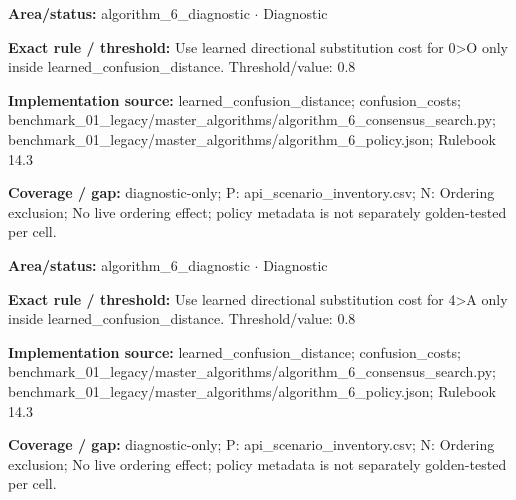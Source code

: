 \begin{tcolorbox}[enhanced,breakable,colback=white,colframe=Muted!45,boxrule=0.45pt,arc=1.5pt,left=6pt,right=6pt,top=5pt,bottom=5pt,title={\texttt{A6-LEARNED-SUBSTITUTION-0-O}},title after break={\texttt{A6-LEARNED-SUBSTITUTION-0-O}\ (continued)},fonttitle=\headingfont\bfseries\color{Navy},coltitle=Navy]
\textbf{Area/status:} algorithm\_\allowbreak{}6\_\allowbreak{}diagnostic $\boldsymbol{\cdot}$ Diagnostic\par
\smallskip
\textbf{Exact rule / threshold:} Use learned directional substitution cost for 0>O only inside learned\_\allowbreak{}confusion\_\allowbreak{}distance. Threshold/\allowbreak{}value: 0.8\par
\smallskip
\textbf{Implementation source:} learned\_\allowbreak{}confusion\_\allowbreak{}distance; confusion\_\allowbreak{}costs; benchmark\_\allowbreak{}01\_\allowbreak{}legacy/\allowbreak{}master\_\allowbreak{}algorithms/\allowbreak{}algorithm\_\allowbreak{}6\_\allowbreak{}consensus\_\allowbreak{}search.py; benchmark\_\allowbreak{}01\_\allowbreak{}legacy/\allowbreak{}master\_\allowbreak{}algorithms/\allowbreak{}algorithm\_\allowbreak{}6\_\allowbreak{}policy.json; Rulebook 14.3\par
\smallskip
\textbf{Coverage / gap:} diagnostic-only; P: api\_\allowbreak{}scenario\_\allowbreak{}inventory.csv; N: Ordering exclusion; No live ordering effect; policy metadata is not separately golden-tested per cell.
\end{tcolorbox}
\begin{tcolorbox}[enhanced,breakable,colback=white,colframe=Muted!45,boxrule=0.45pt,arc=1.5pt,left=6pt,right=6pt,top=5pt,bottom=5pt,title={\texttt{A6-LEARNED-SUBSTITUTION-4-A}},title after break={\texttt{A6-LEARNED-SUBSTITUTION-4-A}\ (continued)},fonttitle=\headingfont\bfseries\color{Navy},coltitle=Navy]
\textbf{Area/status:} algorithm\_\allowbreak{}6\_\allowbreak{}diagnostic $\boldsymbol{\cdot}$ Diagnostic\par
\smallskip
\textbf{Exact rule / threshold:} Use learned directional substitution cost for 4>A only inside learned\_\allowbreak{}confusion\_\allowbreak{}distance. Threshold/\allowbreak{}value: 0.8\par
\smallskip
\textbf{Implementation source:} learned\_\allowbreak{}confusion\_\allowbreak{}distance; confusion\_\allowbreak{}costs; benchmark\_\allowbreak{}01\_\allowbreak{}legacy/\allowbreak{}master\_\allowbreak{}algorithms/\allowbreak{}algorithm\_\allowbreak{}6\_\allowbreak{}consensus\_\allowbreak{}search.py; benchmark\_\allowbreak{}01\_\allowbreak{}legacy/\allowbreak{}master\_\allowbreak{}algorithms/\allowbreak{}algorithm\_\allowbreak{}6\_\allowbreak{}policy.json; Rulebook 14.3\par
\smallskip
\textbf{Coverage / gap:} diagnostic-only; P: api\_\allowbreak{}scenario\_\allowbreak{}inventory.csv; N: Ordering exclusion; No live ordering effect; policy metadata is not separately golden-tested per cell.
\end{tcolorbox}
